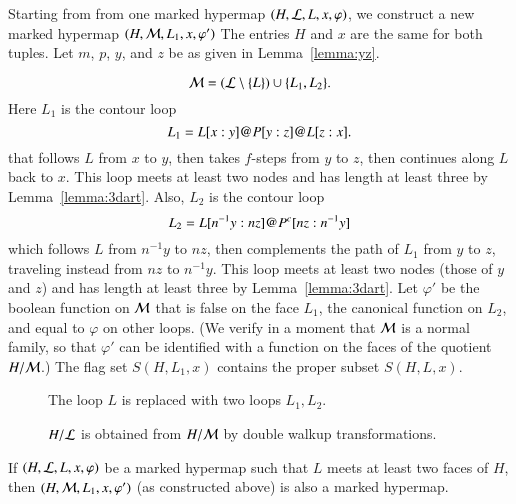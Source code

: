 Starting from from one marked hypermap $(H,{\cal L},L,x,\varphi)$, we construct a new marked hypermap $(H,{\cal M},L_1,x,\varphi')$
The entries $H$ and $x$ are the same for both tuples.  
Let $m$, $p$, $y$, and $z$ be as given in Lemma~\ref{lemma:yz}.

\begin{displaymath}{\cal M} = ({\cal L}\setminus \{L\}) \cup
\{L_1,L_2\}.\end{displaymath}
Here $L_1$ is the contour loop
\begin{displaymath}
L_1 = L[x:y] {{\operatorname{@}}} P[y:z] {{\operatorname{@}}} L[z:x].
\end{displaymath}
that follows $L$ from $x$ to $y$, then takes $f$-steps from $y$ to
$z$, then continues along $L$ back to $x$.  This loop meets at least
two nodes and has length at least three by
Lemma~\ref{lemma:3dart}. Also, $L_2$ is the contour loop
\begin{displaymath}
L_2 = L[n^{-1}y:n z] {{\operatorname{@}}} P^c[n z:n^{-1}y]
\end{displaymath}
which follows $L$ from $n^{-1} y$ to $n z$, then complements the path
of $L_1$ from $y$ to $z$, traveling instead from $n z$ to $n^{-1} y$.
This loop meets at least two nodes (those of $y$ and $z$) and has
length at least three by Lemma~\ref{lemma:3dart}.
%
Let $\varphi'$ be the boolean function on $\cal M$ that is false on
the face $L_1$, the canonical function on $L_2$, and  equal to $\varphi$ on other loops. (We verify in a moment that ${\cal M}$ is a normal family, so that $\varphi'$ can be identified with a function on the faces of  the quotient $H/{\cal M}$.) 
The flag set $S(H,L_1,x)$  contains the proper
subset $S(H,L,x)$.
%
%


\begin{figure}[htb]
\centering
{}
\caption{The loop $L$ is replaced with two loops $L_1, L_2$.}
\label{fig:L1L2}
\end{figure}

\begin{figure}[htb]
\centering
{}
\caption{$H/{\cal L}$ is obtained from $H/{\cal M}$ by double walkup
transformations.}
\label{fig:L1L2dart}
\end{figure}



\begin{lemma}  
If $(H,{\cal L},L,x,\varphi)$ be a marked hypermap such that $L$
meets at least two faces of $H$,  then
$(H,{\cal M},L_1,x,\varphi')$ (as constructed above)
is also a marked hypermap.
\end{lemma}

